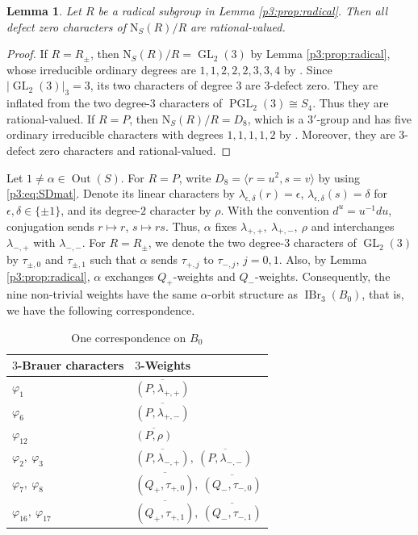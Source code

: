 \documentclass[11pt,a4paper]{article}
\numberwithin{equation}{section}
\newtheorem{lemma}[theorem]{Lemma}
\theoremstyle{definition}
\theoremstyle{remark}
\newcommand{\IBr}{\operatorname{IBr}}
\newcommand{\Out}{\operatorname{Out}}
\newcommand{\GL}{\operatorname{GL}}
\newcommand{\Nor}{\mathrm{N}}
\newcommand{\HH}{\mathcal H}
\newcommand{\QQ}{\mathbb Q}
\newcommand{\NN}{\mathrm N}
\begin{document}
\begin{lemma}\label{equ1}
Let $R$ be a radical subgroup in Lemma \ref{p3:prop:radical}.
Then all defect zero characters of $\NN_S(R)/R$  are rational-valued.
\end{lemma}
\begin{proof}
If \(R=R_\pm\), then \(\Nor_S(R)/R=\GL_2(3)\) by Lemma \ref{p3:prop:radical}, whose irreducible ordinary degrees are $1,1,2,2,2,3,3,4$ by \cite{T}.
Since \(|\GL_2(3)|_3=3\),  its two characters of degree
\(3\) are \(3\)-defect zero. They are inflated from the
two degree-\(3\) characters of \(\operatorname{PGL}_2(3)\cong S_4\). Thus they are rational-valued. If \(R=P\), then \(\Nor_S(R)/R=D_8\), which is a \(3'\)-group and has five ordinary irreducible characters with degrees \(1,1,1,1,2\) by \cite{T}. Moreover, they are $3$-defect zero characters and rational-valued. 
\end{proof}

Let \(1\neq \alpha\in \Out(S)\). For $R=P$, write
\(D_8=\langle r=u^2,s=v\rangle\) by using \eqref{p3:eq:SDmat}. Denote its linear characters by
\(\lambda_{\epsilon,\delta}(r)=\epsilon\),
\(\lambda_{\epsilon,\delta}(s)=\delta\) for
\(\epsilon,\delta\in\{\pm1\}\), and its degree-\(2\) character by \(\rho\).  
With the convention \(d^u=u^{-1}du\), conjugation sends
\(r\mapsto r\), \(s\mapsto rs\).  Thus, $\alpha$ fixes
 $\lambda_{+,+},\ \lambda_{+,-},\ \rho$ and interchanges \(\lambda_{-,+}\) with \(\lambda_{-,-}\).
For \(R=R_\pm\), we denote the two degree-\(3\) characters of \(\GL_2(3)\) by \(\tau_{\pm,0}\) and \(\tau_{\pm,1}\) such that $\alpha$ sends \(\tau_{+,j}\) to \(\tau_{-,j}\), \(j=0,1\). 
Also, by Lemma \ref{p3:prop:radical}, $\alpha$ exchanges 
\(Q_+\)-weights and \(Q_-\)-weights. Consequently, the nine non-trivial weights have the same $\alpha$-orbit structure as \(\IBr_3(B_0)\), that is, we have the following correspondence.
\begin{table}[ht]
\centering
\caption{One correspondence on $B_0$}\label{tab:6}
\begin{tabular}{@{}ll@{}}
\toprule
$3$-Brauer characters&$3$-Weights\\
\midrule
\(\varphi_1\)&\(\overline{(P,\lambda_{+,+})}\)\\
\(\varphi_6\)&\(\overline{(P,\lambda_{+,-})}\)\\
\(\varphi_{12}\)&\(\overline{(P,\rho)}\)\\
\(\varphi_2,\ \varphi_3\)&\(\overline{(P,\lambda_{-,+})},\ \overline{(P,\lambda_{-,-})}\)\\
\(\varphi_7,\ \varphi_8\)&\(\overline{(Q_+,\tau_{+,0})},\ \overline{(Q_-,\tau_{-,0})}\)\\
\(\varphi_{16},\ \varphi_{17}\)&\(\overline{(Q_+,\tau_{+,1})},\ \overline{(Q_-,\tau_{-,1})}\)\\
\bottomrule
\end{tabular}
\end{table}
\end{document}
